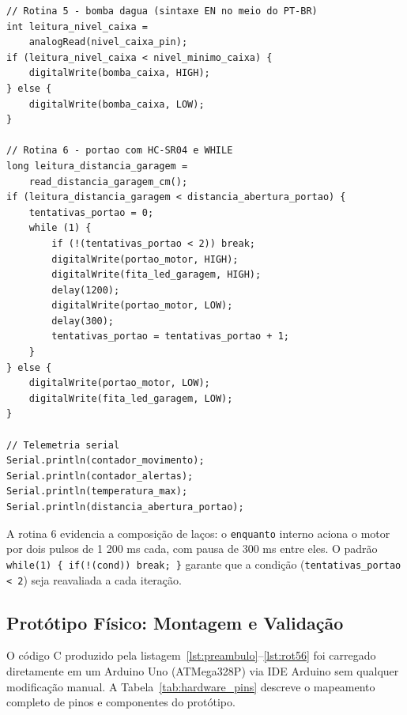 \documentclass[conference]{IEEEtran}
\begin{document}
\begin{lstlisting}[style=csmall,caption={Rotinas 5 e 6 — bomba e portão com WHILE.},label={lst:rot56}]
// Rotina 5 - bomba dagua (sintaxe EN no meio do PT-BR)
int leitura_nivel_caixa =
    analogRead(nivel_caixa_pin);
if (leitura_nivel_caixa < nivel_minimo_caixa) {
    digitalWrite(bomba_caixa, HIGH);
} else {
    digitalWrite(bomba_caixa, LOW);
}

// Rotina 6 - portao com HC-SR04 e WHILE
long leitura_distancia_garagem =
    read_distancia_garagem_cm();
if (leitura_distancia_garagem < distancia_abertura_portao) {
    tentativas_portao = 0;
    while (1) {
        if (!(tentativas_portao < 2)) break;
        digitalWrite(portao_motor, HIGH);
        digitalWrite(fita_led_garagem, HIGH);
        delay(1200);
        digitalWrite(portao_motor, LOW);
        delay(300);
        tentativas_portao = tentativas_portao + 1;
    }
} else {
    digitalWrite(portao_motor, LOW);
    digitalWrite(fita_led_garagem, LOW);
}

// Telemetria serial
Serial.println(contador_movimento);
Serial.println(contador_alertas);
Serial.println(temperatura_max);
Serial.println(distancia_abertura_portao);
\end{lstlisting}

A rotina 6 evidencia a composição de laços: o \texttt{enquanto} interno
aciona o motor por dois pulsos de 1 200 ms cada, com pausa de 300 ms entre
eles. O padrão \texttt{while(1) \{ if(!(cond)) break; \}} garante que a
condição (\texttt{tentativas\_portao < 2}) seja reavaliada a cada iteração.

\subsection{Protótipo Físico: Montagem e Validação}

O código C produzido pela listagem~\ref{lst:preambulo}--\ref{lst:rot56}
foi carregado diretamente em um Arduino Uno (ATMega328P) via IDE Arduino
sem qualquer modificação manual. A Tabela~\ref{tab:hardware_pins} descreve
o mapeamento completo de pinos e componentes do protótipo.
\end{document}
